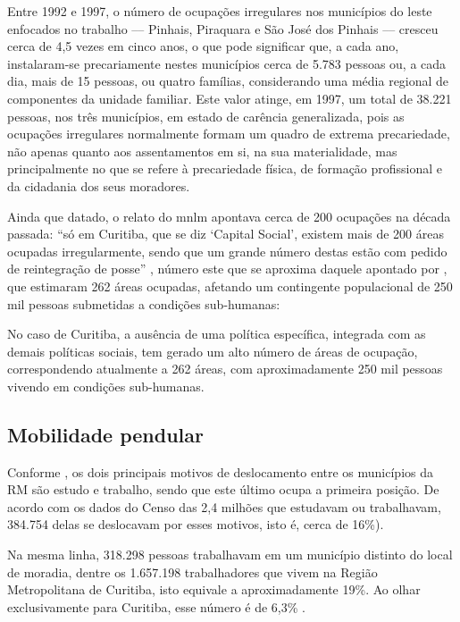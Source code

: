 	\begin{citacao}
		Entre 1992 e 1997, o número de ocupações irregulares nos municípios do leste enfocados no trabalho --– Pinhais, Piraquara e São José dos Pinhais –-- cresceu cerca de 4,5 vezes em cinco anos, o que pode significar que, a cada ano, instalaram-se precariamente nestes municípios cerca de 5.783 pessoas ou, a cada dia, mais de 15 pessoas, ou quatro famílias, considerando uma média regional de componentes da unidade familiar. Este valor atinge, em 1997, um total de 38.221 pessoas, nos três municípios, em estado de carência generalizada, pois as ocupações irregulares normalmente formam um quadro de extrema precariedade, não apenas quanto aos assentamentos em si, na sua materialidade, mas principalmente no que se refere à precariedade física, de formação profissional e da cidadania dos seus moradores.
	\end{citacao}

	Ainda que datado, o relato do \gls{mnlm} apontava cerca de 200 ocupações na década passada: ``só em Curitiba, que se diz `Capital Social', existem mais de 200 áreas ocupadas irregularmente, sendo que um grande número destas estão com pedido de reintegração de posse'' \cite[p. 127]{hilma2009a}, número este que se aproxima daquele apontado por , que estimaram 262 áreas ocupadas, afetando um contingente populacional de 250 mil pessoas submetidas a condições sub-humanas:

	\begin{citacao}
		No caso de Curitiba, a ausência de uma política específica, integrada com as demais políticas sociais, tem gerado um alto número de áreas de ocupação, correspondendo atualmente a 262 áreas, com aproximadamente 250 mil pessoas vivendo em condições sub-humanas.
	\end{citacao}

	\subsection{Mobilidade pendular}
	
	Conforme , os dois principais motivos de deslocamento entre os municípios da RM são estudo e trabalho, sendo que este último ocupa a primeira posição. De acordo com os dados do Censo das 2,4 milhões que estudavam ou trabalhavam, 384.754 delas se deslocavam por esses motivos, isto é, cerca de 16\%).
	
	Na mesma linha, 318.298 pessoas trabalhavam em um município distinto do local de moradia, dentre os 1.657.198 trabalhadores que vivem na Região Metropolitana de Curitiba, isto equivale a aproximadamente 19\%. Ao olhar exclusivamente para Curitiba, esse número é de 6,3\% .
	
